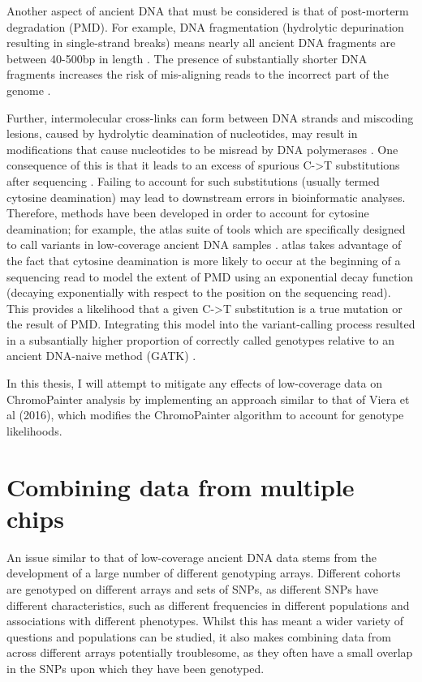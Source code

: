 Another aspect of ancient DNA that must be considered is that of post-morterm degradation (PMD). For example, DNA fragmentation (hydrolytic depurination resulting in single-strand breaks) means nearly all ancient DNA fragments are between 40-500bp in length \cite{paabo1989ancient, paabo1991miocene}. The presence of substantially shorter DNA fragments increases the risk of mis-aligning reads to the incorrect part of the genome \cite{de2018quantifying}.

Further, intermolecular cross-links can form between DNA strands \cite{paabo1989ancient} and miscoding lesions, caused by hydrolytic deamination of nucleotides, may result in modifications that cause nucleotides to be misread by DNA polymerases \cite{dabney2013ancient}. One consequence of this is that it leads to an excess of spurious C->T substitutions after sequencing \cite{paabo1989ancient}. Failing to account for such substitutions (usually termed cytosine deamination) may lead to downstream errors in bioinformatic analyses. Therefore, methods have been developed in order to account for cytosine deamination; for example, the atlas suite of tools which are specifically designed to call variants in low-coverage ancient DNA samples \cite{Link2017}. atlas  takes advantage of the fact that cytosine deamination is more likely to occur at the beginning of a sequencing read to model the extent of PMD using an exponential decay function (decaying exponentially with respect to the position on the sequencing read). This provides a likelihood that a given C->T substitution is a true mutation or the result of PMD. Integrating this model into the variant-calling process resulted in a subsantially higher proportion of correctly called genotypes relative to an ancient DNA-naive method (GATK) \cite{Link2017}. 


In this thesis, I will attempt to mitigate any effects of low-coverage data on ChromoPainter analysis by implementing an approach similar to that of Viera et al (2016), which modifies the ChromoPainter algorithm to account for genotype likelihoods.


\section{Combining data from multiple chips}

An issue similar to that of low-coverage ancient DNA data stems from the development of a large number of different genotyping arrays. Different cohorts are genotyped on different arrays and sets of SNPs, as different SNPs have different characteristics, such as different frequencies in different populations and associations with different phenotypes. Whilst this has meant a wider variety of questions and populations can be studied, it also makes combining data from across different arrays potentially troublesome, as they often have a small overlap in the SNPs upon which they have been genotyped.

